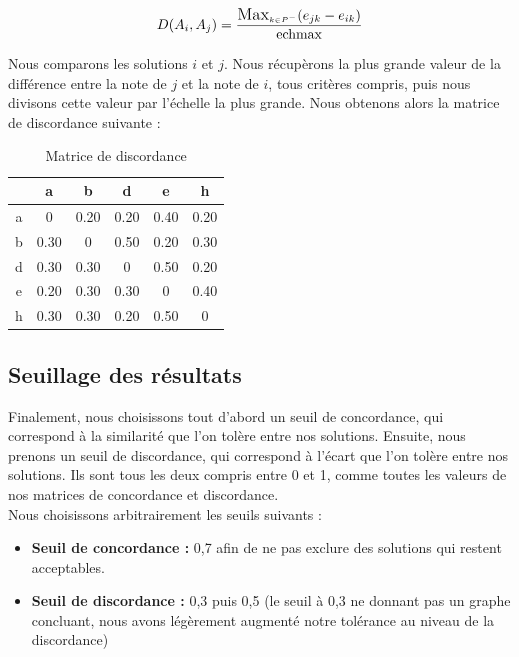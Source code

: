 \documentclass[paper=a4, fontsize=11pt]{report}
\numberwithin{equation}{section}		%
\numberwithin{figure}{section}			%
\numberwithin{table}{section}				%
\renewcommand{\bf}[1]{\textbf{#1}}
\begin{document}
\begin{equation*}
D(A_i, A_j) = \frac{\mathlarger{\mathlarger{\text{Max}}}_{\mathsmaller{k \in P^- }} (e_{jk} - e_{ik})}{\text{echmax}}
\end{equation*} 

Nous comparons les solutions $i$ et $j$. Nous récupèrons la plus grande valeur de la différence entre la note de $j$ et la note de $i$, tous critères compris, puis nous divisons cette valeur par l’échelle la plus grande. Nous obtenons alors la matrice de discordance suivante : \\

\begin{table}[H]
\begin{center}
\begin{tabular}{c|ccccc}
 & a & b & d & e & h \\ 
\hline 
a & 0 & 0.20	 & 0.20 & 0.40 & 0.20 \\ 
b & 0.30 & 0	& 0.50 & 0.20 &	0.30 \\ 
d & 0.30 & 0.30 & 0 & 0.50 &	0.20 \\ 
e & 0.20 & 0.30 & 0.30 & 0 & 0.40 \\ 
h & 0.30 & 0.30 & 0.20 &	0.50 & 0\\ 
\end{tabular} 
\caption{Matrice de discordance} 
\end{center}
\end{table}

\subsection{Seuillage des résultats}

Finalement, nous choisissons tout d’abord un seuil de concordance, qui correspond à la similarité que l’on tolère entre nos solutions. Ensuite, nous prenons un seuil de discordance, qui correspond à l’écart que l’on tolère entre nos solutions. Ils sont tous les deux compris entre 0 et 1, comme toutes les valeurs de nos matrices de concordance et discordance.\\

Nous choisissons arbitrairement les seuils suivants : \\

\begin{itemize}
\item \bf{Seuil de concordance :} 0,7 afin de ne pas exclure des solutions qui restent acceptables.
\item \bf{Seuil de discordance :} 0,3 puis 0,5 (le seuil à 0,3 ne donnant pas un graphe concluant, nous avons légèrement augmenté notre tolérance au niveau de la discordance)
\end{itemize}
\end{document}
